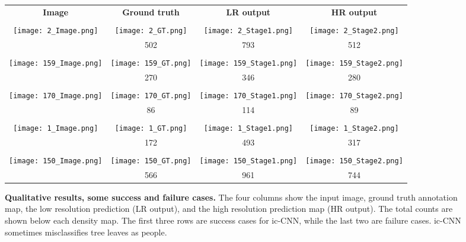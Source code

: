 \documentclass[runningheads]{llncs}
\begin{document}
\setlength{\tabcolsep}{3pt}
\begin{figure}
\begin{tabular}{cccc} 

{\bf Image} & {\bf Ground truth} & {\bf LR output} & {\bf HR  output} \\ \\ 
{  
	\texttt{[image: 2\_Image.png]}
     } &  {  
	\texttt{[image: 2\_GT.png]}
     }
     &
     {\texttt{[image: 2\_Stage1.png]}
     } & 
     {\texttt{[image: 2\_Stage2.png]}
     } \\
    &502  & 793 & 512\\
   \\ 
{  
	\texttt{[image: 159\_Image.png]}
     } &  {  
	\texttt{[image: 159\_GT.png]}
     }
     &
     {\texttt{[image: 159\_Stage1.png]}
     } & 
     {\texttt{[image: 159\_Stage2.png]}
     } \\
    &270  & 346 & 280\\
   \\ 
{  
	\texttt{[image: 170\_Image.png]}
     } &  {  
	\texttt{[image: 170\_GT.png]}
     }
     &
     {\texttt{[image: 170\_Stage1.png]}
     } & 
     {\texttt{[image: 170\_Stage2.png]}
     } \\
    &86  & 114 & 89\\
   \\ 
{  
	\texttt{[image: 1\_Image.png]}
     } &  {  
	\texttt{[image: 1\_GT.png]}
     }
     &
     {\texttt{[image: 1\_Stage1.png]}
     } & 
     {\texttt{[image: 1\_Stage2.png]}
     } \\
    &172  & 493 & 317\\
   \\ 
   {  
	\texttt{[image: 150\_Image.png]}
     } &  {  
	\texttt{[image: 150\_GT.png]}
     }
     &
     {\texttt{[image: 150\_Stage1.png]}
     } & 
     {\texttt{[image: 150\_Stage2.png]}
     } \\
    &566  & 961 & 744\\
\end{tabular}
\caption{{\bf Qualitative results, some success and failure cases.} The four columns show the input image, ground truth annotation map, the low resolution prediction (LR output), and the high resolution prediction map (HR output). The total counts are shown below each density map. The first three rows are success cases for ic-CNN, while the last two are failure cases. ic-CNN sometimes misclassifies tree leaves as people.\label{quali}}
\end{figure}
\end{document}
